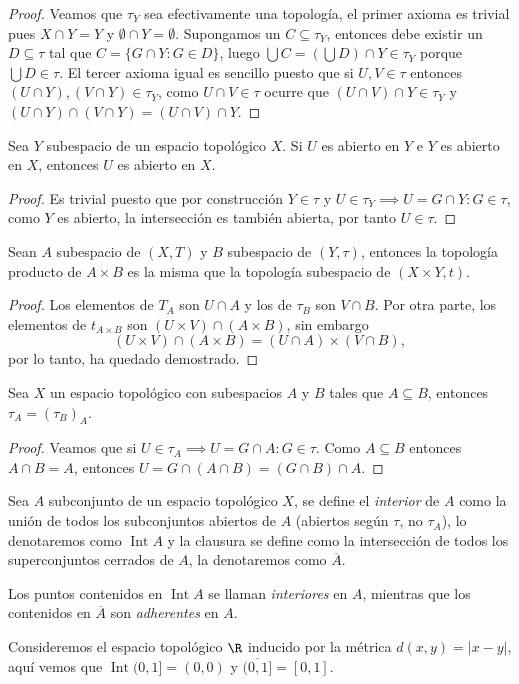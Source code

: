 \documentclass[11pt,oneside,a4paper]{book}
\DeclareMathOperator{\Int}{Int}
\begin{document}
\begin{proof}
Veamos que $\tau_Y$ sea efectivamente una topología, el primer axioma es trivial pues $X\cap Y=Y$ y $\emptyset\cap Y=\emptyset$. Supongamos un $C\subseteq\tau_Y$, entonces debe existir un $D\subseteq\tau$ tal que $C=\{G\cap Y:G\in D\}$, luego $\bigcup C=\left(\bigcup D\right)\cap Y\in\tau_Y$ porque $\bigcup D\in\tau$. El tercer axioma igual es sencillo puesto que si $U,V\in\tau$ entonces $(U\cap Y),(V\cap Y)\in\tau_Y$, como $U\cap V\in\tau$ ocurre que $(U\cap V)\cap Y\in\tau_Y$ y $(U\cap Y)\cap(V\cap Y)=(U\cap V)\cap Y$.
\end{proof}
\begin{cor}
Sea $Y$ subespacio de un espacio topológico $X$. Si $U$ es abierto en $Y$ e $Y$ es abierto en $X$, entonces $U$ es abierto en $X$.
\end{cor}
\begin{proof}
Es trivial puesto que por construcción $Y\in\tau$ y $U\in\tau_Y\implies U=G\cap Y:G\in\tau$, como $Y$ es abierto, la intersección es también abierta, por tanto $U\in\tau$.
\end{proof}
\begin{thm}
Sean $A$ subespacio de $(X,T)$ y $B$ subespacio de $(Y,\tau)$, entonces la topología producto de $A\times B$ es la misma que la topología subespacio de $(X\times Y,t)$.
\end{thm}
\begin{proof}
Los elementos de $T_A$ son $U\cap A$ y los de $\tau_B$ son $V\cap B$. Por otra parte, los elementos de $t_{A\times B}$ son $(U\times V)\cap(A\times B)$, sin embargo
$$(U\times V)\cap(A\times B)=(U\cap A)\times(V\cap B),$$
por lo tanto, ha quedado demostrado.
\end{proof}
\begin{thm}
Sea $X$ un espacio topológico con subespacios $A$ y $B$ tales que $A\subseteq B$, entonces $\tau_A=(\tau_B)_A$.
\end{thm}
\begin{proof}
Veamos que si $U\in\tau_A\implies U=G\cap A:G\in\tau$. Como $A\subseteq B$ entonces $A\cap B=A$, entonces $U=G\cap(A\cap B)=(G\cap B)\cap A$.
\end{proof}
\begin{mydef}
Sea $A$ subconjunto de un espacio topológico $X$, se define el \textit{interior} de $A$ como la unión de todos los subconjuntos abiertos de $A$ (abiertos según $\tau$, no $\tau_A$), lo denotaremos como $\Int A$ y la clausura se define como la intersección de todos los superconjuntos cerrados de $A$, la denotaremos como $\overline{A}$.

Los puntos contenidos en $\Int A$ se llaman \textit{interiores} en $A$, mientras que los contenidos en $\overline{A}$ son \textit{adherentes} en $A$.
\end{mydef}
Consideremos el espacio topológico $\R$ inducido por la métrica $d(x,y)=|x-y|$, aquí vemos que $\Int(0,1]=(0,0)$ y $\overline{(0,1]}=[0,1]$.
\end{document}
